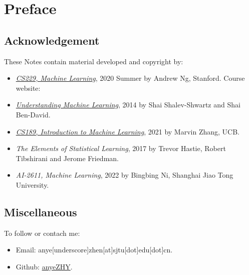 \section*{Preface}
\subsection*{Acknowledgement}
These Notes contain material developed and copyright by:
\begin{itemize}
	\item
		\href{http://cs229.stanford.edu/syllabus-summer2020.html}{\textit{CS229, Machine Learning}}, {\textcopyright} 2020 Summer by Andrew Ng, Stanford. Course website: 
	\item 
		\href{https://www.cs.huji.ac.il/w~shais/UnderstandingMachineLearning/}{\textit{Understanding Machine Learning}}, {\textcopyright} 2014 by Shai Shalev-Shwartz and Shai Ben-David.
	\item
		\href{https://www.eecs189.org}{\textit{CS189, Introduction to Machine Learning}}, {\textcopyright} 2021 by Marvin Zhang, UCB.
	\item
		\textit{The Elements of Statistical Learning}, {\textcopyright} 2017 by  Trevor Hastie, Robert Tibshirani and Jerome Friedman.
	\item
		\textit{AI-2611, Machine Learning}, {\textcopyright} 2022 by Bingbing Ni, Shanghai Jiao Tong University.
\end{itemize}

\subsection*{Miscellaneous}
To follow or contach me:
\begin{itemize}
	\item
		Email: anye[underscore]zhen[at]sjtu[dot]edu[dot]cn.
	\item
		Github: \href{http://github.com/anyeZHY}{anyeZHY}.
\end{itemize}

